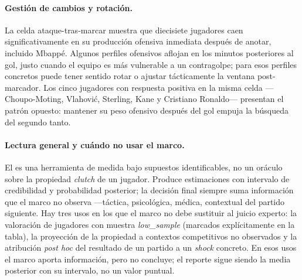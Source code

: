 \paragraph{Gestión de cambios y rotación.}
La celda ataque-tras-marcar muestra que diecisiete jugadores caen
significativamente en su producción ofensiva inmediata después de
anotar, incluido Mbappé. Algunos perfiles ofensivos aflojan en los
minutos posteriores al gol, justo cuando el equipo es más vulnerable
a un contragolpe; para esos perfiles concretos puede tener sentido
rotar o ajustar tácticamente la ventana post-marcador. Los cinco
jugadores con respuesta positiva en la misma celda ---Choupo-Moting,
Vlahović, Sterling, Kane y Cristiano Ronaldo--- presentan el patrón
opuesto: mantener su peso ofensivo después del gol empuja la
búsqueda del segundo tanto.

\paragraph{Lectura general y cuándo no usar el marco.}
El \CCV es una herramienta de medida bajo supuestos identificables,
no un oráculo sobre la propiedad \textit{clutch} de un jugador. Produce
estimaciones con intervalo de credibilidad y probabilidad posterior;
la decisión final siempre suma información que el marco no observa
---táctica, psicológica, médica, contextual del partido siguiente.
Hay tres usos en los que el marco no debe sustituir al juicio experto:
la valoración de jugadores con muestra \textit{low\_sample} (marcados
explícitamente en la tabla), la proyección de la propiedad a contextos
competitivos no observados y la atribución \textit{post hoc} del
resultado de un partido a un \textit{shock} concreto. En esos usos
el marco aporta información, pero no concluye; el reporte sigue siendo
la media posterior con su intervalo, no un valor puntual.
